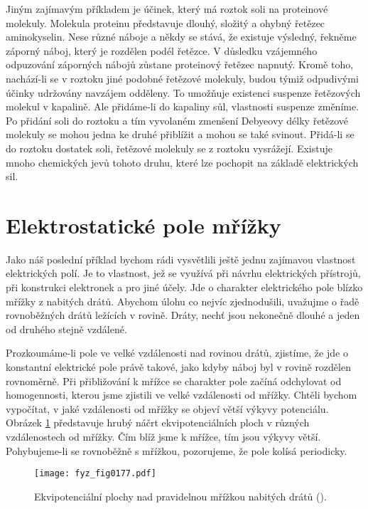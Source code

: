   Jiným zajímavým příkladem je účinek, který má roztok soli na proteinové molekuly. Molekula
  proteinu představuje dlouhý, složitý a ohybný řetězec aminokyselin. Nese různé náboje a někdy se
  stává, že existuje výsledný, řekněme záporný náboj, který je rozdělen podél řetězce. V důsledku
  vzájemného odpuzování záporných nábojů zůstane proteinový řetězec napnutý. Kromě toho, nachází-li
  se v roztoku jiné podobné řetězové molekuly, budou týmiž odpudivými účinky udržovány navzájem
  odděleny. To umožňuje existenci suspenze řetězových molekul v kapalině. Ale přidáme-li do kapaliny
  sůl, vlastnosti suspenze změníme. Po přidání soli do roztoku a tím vyvolaném zmenšení Debyeovy
  délky řetězové molekuly se mohou jedna ke druhé přiblížit a mohou se také svinout. Přidá-li se do
  roztoku dostatek soli, řetězové molekuly se z roztoku vysrážejí. Existuje mnoho chemických jevů
  tohoto druhu, které lze pochopit na základě elektrických sil.

\section{Elektrostatické pole mřížky}\label{fyz:IIchapVsecXXVI} 
  Jako náš poslední příklad bychom rádi vysvětlili ještě jednu zajímavou vlastnost elektrických
  polí. Je to vlastnost, jež se využívá při návrhu elektrických přístrojů, při konstrukci elektronek
  a pro jiné účely. Jde o charakter elektrického pole blízko mřížky z nabitých drátů. Abychom úlohu
  co nejvíc zjednodušili, uvažujme o řadě rovnoběžných drátů ležících v rovině. Dráty, nechť jsou
  nekonečně dlouhé a jeden od druhého stejně vzdálené.

  Prozkoumáme-li pole ve velké vzdálenosti nad rovinou drátů, zjistíme, že jde o konstantní
  elektrické pole právě takové, jako kdyby náboj byl v rovině rozdělen rovnoměrně. Při přibližování
  k mřížce se charakter pole začíná odchylovat od homogennosti, kterou jsme zjistili ve velké
  vzdálenosti od mřížky. Chtěli bychom vypočítat, v jaké vzdálenosti od mřížky se objeví větší
  výkyvy potenciálu. Obrázek \ref{fyz:fig0177} představuje hrubý náčrt ekvipotenciálních ploch v
  různých vzdálenostech od mřížky. Čím blíž jsme k mřížce, tím jsou výkyvy větší. Pohybujeme-li se
  rovnoběžně s mřížkou, pozorujeme, že pole kolísá periodicky.

  \begin{figure}[ht!]  %
    \centering
    \texttt{[image: fyz\_fig0177.pdf]}
    \caption{Ekvipotenciální plochy nad pravidelnou mřížkou nabitých drátů
             (\cite[s.~136]{Feynman02}).}
    \label{fyz:fig0177}
  \end{figure}

